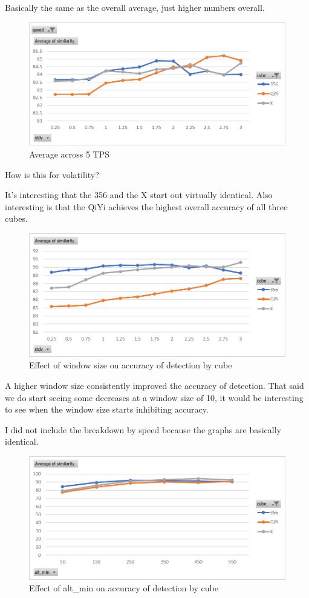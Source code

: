 Basically the same as the overall average, just higher numbers overall.

\begin{figure}[h]
    \centering
    \caption{Average across 5 TPS}
    \label{fig:similarity-by-cube-5tps}
    \includegraphics[width=0.75\linewidth]{Figures/7 Evaluation/similarity_by_cube_5tps.png}
\end{figure}

How is this for volatility? 

It's interesting that the 356 and the X start out virtually identical.
Also interesting is that the QiYi achieves the highest overall accuracy
of all three cubes.

\begin{figure}[h]
    \centering
    \caption{Effect of window size on accuracy of detection by cube}
    \label{fig:similarity-by-window-size}
    \includegraphics[width=0.75\linewidth]{Figures/7 Evaluation/similarity_by_cube.png}
\end{figure}

A higher window size consistently improved the accuracy of detection.
That said we do start seeing some decreases at a window size of 10, it
would be interesting to see when the window size starts inhibiting
accuracy.

I did not include the breakdown by speed because the graphs are
basically identical.

\begin{figure}[h]
    \centering
    \caption{Effect of alt\_min on accuracy of detection by cube}
    \label{fig:similarity-by-alt-min}
    \includegraphics[width=0.75\linewidth]{Figures/7 Evaluation/similarity_by_alt_min.png}
\end{figure}

